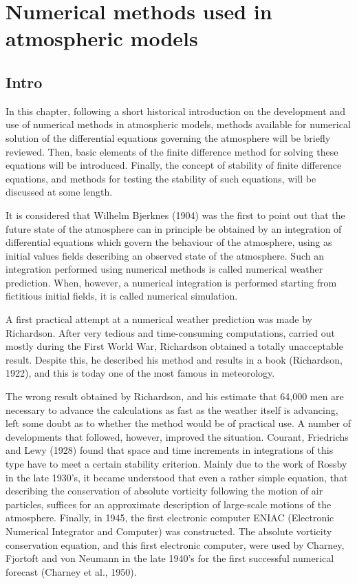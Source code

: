 \chapter{Numerical methods used in atmospheric models}
\section{Intro}
In this chapter, following a short historical introduction on the development and use of numerical methods in atmospheric models, methods available for numerical solution of the differential equations governing the atmosphere will be briefly reviewed. Then, basic elements of the finite difference method for solving these equations will be introduced. Finally, the concept of stability of finite difference equations, and methods for testing the stability of such equations, will be discussed at some length.

It is considered that Wilhelm Bjerknes (1904) was the first to point out that the future state of the atmosphere can in principle be obtained by an integration of differential equations which govern the behaviour of the atmosphere, using as initial values fields describing an observed state of the atmosphere. Such an integration performed using numerical methods is called numerical weather prediction. When, however, a numerical integration is performed starting from fictitious initial fields, it is called numerical simulation.

A first practical attempt at a numerical weather predic­tion was made by Richardson. After very tedious and time-consuming computations, carried out mostly during the First World War, Richardson obtained a totally unacceptable result. Despite this, he described his method and results in a book (Richardson, 1922), and this is today one of the most famous in meteorology.

The wrong result obtained by Richardson, and his estimate that 64,000 men are necessary to advance the calculations as fast as the weather itself is advancing, left some doubt as to whether the method would be of practical use. A number of developments that followed, however, improved the situation. Courant, Friedrichs and Lewy (1928) found that space and time increments in integrations of this type have to meet a certain stability criterion. Mainly due to the work of Rossby in the late 1930’s, it became understood that even a rather simple equation, that describing the conservation of absolute vorticity following the motion of air particles, suffices for an approximate description of large-scale motions of the atmosphere. Finally, in 1945, the first electronic computer ENIAC (Electronic Numerical Integrator and Computer) was constructed. The absolute vorticity conservation equation, and this first electronic computer, were used by Charney, Fjortoft and von Neumann in the late 1940’s for the first successful numerical forecast (Charney et al., 1950).

